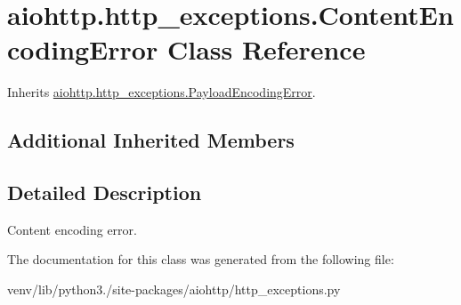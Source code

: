 \hypertarget{classaiohttp_1_1http__exceptions_1_1_content_encoding_error}{}\section{aiohttp.\+http\+\_\+exceptions.\+Content\+Encoding\+Error Class Reference}
\label{classaiohttp_1_1http__exceptions_1_1_content_encoding_error}


Inherits \hyperlink{classaiohttp_1_1http__exceptions_1_1_payload_encoding_error}{aiohttp.\+http\+\_\+exceptions.\+Payload\+Encoding\+Error}.

\subsection*{Additional Inherited Members}


\subsection{Detailed Description}
\begin{DoxyVerb}Content encoding error.\end{DoxyVerb}
 

The documentation for this class was generated from the following file\+:\begin{DoxyCompactItemize}
\item 
venv/lib/python3./site-\/packages/aiohttp/http\+\_\+exceptions.\+py\end{DoxyCompactItemize}

